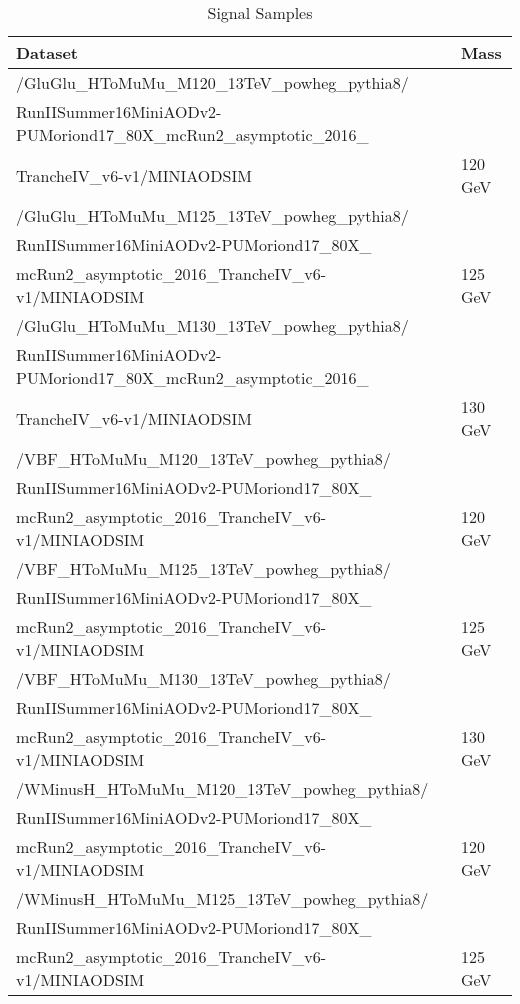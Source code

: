 \begin{table}[!h]
    \caption{Signal Samples}
    \label{table:higgs_mc_signal}
    \begin{center}
        \begin{tabular}{|l|l|}
            \hline
            Dataset & Mass\\
            \hline
            /GluGlu\_HToMuMu\_M120\_13TeV\_powheg\_pythia8/\\RunIISummer16MiniAODv2-PUMoriond17\_80X\_mcRun2\_asymptotic\_2016\_\\TrancheIV\_v6-v1/MINIAODSIM & 120 GeV\\
            /GluGlu\_HToMuMu\_M125\_13TeV\_powheg\_pythia8/\\RunIISummer16MiniAODv2-PUMoriond17\_80X\_\\mcRun2\_asymptotic\_2016\_TrancheIV\_v6-v1/MINIAODSIM & 125 GeV\\
            /GluGlu\_HToMuMu\_M130\_13TeV\_powheg\_pythia8/\\RunIISummer16MiniAODv2-PUMoriond17\_80X\_mcRun2\_asymptotic\_2016\_\\TrancheIV\_v6-v1/MINIAODSIM & 130 GeV\\
            \hline
            /VBF\_HToMuMu\_M120\_13TeV\_powheg\_pythia8/\\RunIISummer16MiniAODv2-PUMoriond17\_80X\_\\mcRun2\_asymptotic\_2016\_TrancheIV\_v6-v1/MINIAODSIM & 120 GeV\\
            /VBF\_HToMuMu\_M125\_13TeV\_powheg\_pythia8/\\RunIISummer16MiniAODv2-PUMoriond17\_80X\_\\mcRun2\_asymptotic\_2016\_TrancheIV\_v6-v1/MINIAODSIM & 125 GeV\\
            /VBF\_HToMuMu\_M130\_13TeV\_powheg\_pythia8/\\RunIISummer16MiniAODv2-PUMoriond17\_80X\_\\mcRun2\_asymptotic\_2016\_TrancheIV\_v6-v1/MINIAODSIM & 130 GeV\\
            \hline
            /WMinusH\_HToMuMu\_M120\_13TeV\_powheg\_pythia8/\\RunIISummer16MiniAODv2-PUMoriond17\_80X\_\\mcRun2\_asymptotic\_2016\_TrancheIV\_v6-v1/MINIAODSIM & 120 GeV\\
            /WMinusH\_HToMuMu\_M125\_13TeV\_powheg\_pythia8/\\RunIISummer16MiniAODv2-PUMoriond17\_80X\_\\mcRun2\_asymptotic\_2016\_TrancheIV\_v6-v1/MINIAODSIM & 125 GeV\\

\end{tabular}
\end{center}
\end{table}
